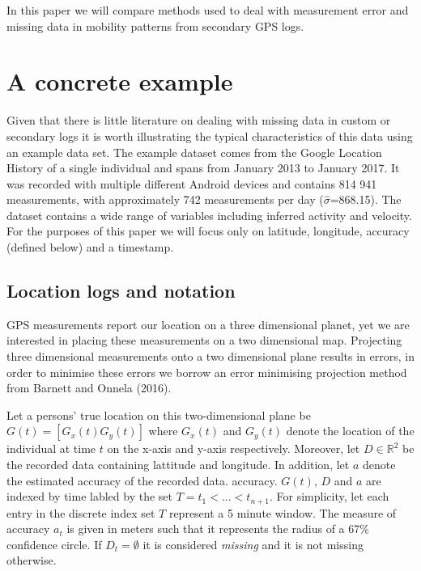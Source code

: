 \documentclass[english,man]{apa6}
\theoremstyle{definition}
\theoremstyle{definition}
\theoremstyle{definition}
\theoremstyle{remark}
\begin{document}
In this paper we will compare methods used to deal with measurement
error and missing data in mobility patterns from secondary GPS logs.

\section{A concrete example}\label{a-concrete-example}

Given that there is little literature on dealing with missing data in
custom or secondary logs it is worth illustrating the typical
characteristics of this data using an example data set. The example
dataset comes from the Google Location History of a single individual
and spans from January 2013 to January 2017. It was recorded with
multiple different Android devices and contains 814 941 measurements,
with approximately 742 measurements per day
(\(\widehat{\sigma}\)=868.15). The dataset contains a wide range of
variables including inferred activity and velocity. For the purposes of
this paper we will focus only on latitude, longitude, accuracy (defined
below) and a timestamp.

\subsection{Location logs and
notation}\label{location-logs-and-notation}

GPS measurements report our location on a three dimensional planet, yet
we are interested in placing these measurements on a two dimensional
map. Projecting three dimensional measurements onto a two dimensional
plane results in errors, in order to minimise these errors we borrow an
error minimising projection method from Barnett and Onnela (2016).

Let a persons' true location on this two-dimensional plane be
\(G(t) = [G_x(t) G_y(t)]\) where \(G_x(t)\) and \(G_y(t)\) denote the
location of the individual at time \(t\) on the x-axis and y-axis
respectively. Moreover, let \(D \in \mathbb{R}^2\) be the recorded data
containing lattitude and longitude. In addition, let \(a\) denote the
estimated accuracy of the recorded data. accuracy. \(G(t)\), \(D\) and
\(a\) are indexed by time labled by the set \(T = t_1 < ... < t_{n+1}\).
For simplicity, let each entry in the discrete index set \(T\) represent
a 5 minute window. The measure of accuracy \(a_t\) is given in meters
such that it represents the radius of a 67\% confidence circle. If
\(D_t = \emptyset\) it is considered \emph{missing} and it is not
missing otherwise.
\end{document}
